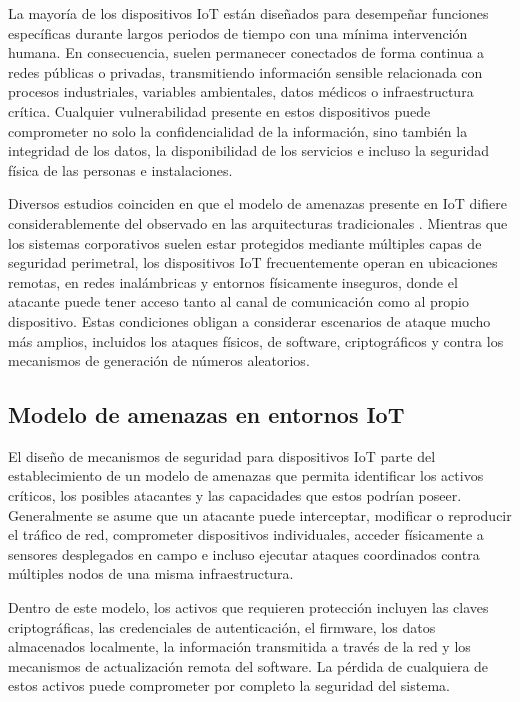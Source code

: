 La mayoría de los dispositivos IoT están diseñados para desempeñar funciones específicas durante largos periodos de tiempo con una mínima intervención humana. En consecuencia, suelen permanecer conectados de forma continua a redes públicas o privadas, transmitiendo información sensible relacionada con procesos industriales, variables ambientales, datos médicos o infraestructura crítica. Cualquier vulnerabilidad presente en estos dispositivos puede comprometer no solo la confidencialidad de la información, sino también la integridad de los datos, la disponibilidad de los servicios e incluso la seguridad física de las personas e instalaciones.

Diversos estudios coinciden en que el modelo de amenazas presente en IoT difiere considerablemente del observado en las arquitecturas tradicionales \cite{Seyhan2022ClassificationTaxonomy}. Mientras que los sistemas corporativos suelen estar protegidos mediante múltiples capas de seguridad perimetral, los dispositivos IoT frecuentemente operan en ubicaciones remotas, en redes inalámbricas y entornos físicamente inseguros, donde el atacante puede tener acceso tanto al canal de comunicación como al propio dispositivo. Estas condiciones obligan a considerar escenarios de ataque mucho más amplios, incluidos los ataques físicos, de software, criptográficos y contra los mecanismos de generación de números aleatorios.

\subsection{Modelo de amenazas en entornos IoT}

El diseño de mecanismos de seguridad para dispositivos IoT parte del establecimiento de un modelo de amenazas que permita identificar los activos críticos, los posibles atacantes y las capacidades que estos podrían poseer. Generalmente se asume que un atacante puede interceptar, modificar o reproducir el tráfico de red, comprometer dispositivos individuales, acceder físicamente a sensores desplegados en campo e incluso ejecutar ataques coordinados contra múltiples nodos de una misma infraestructura.

Dentro de este modelo, los activos que requieren protección incluyen las claves criptográficas, las credenciales de autenticación, el firmware, los datos almacenados localmente, la información transmitida a través de la red y los mecanismos de actualización remota del software. La pérdida de cualquiera de estos activos puede comprometer por completo la seguridad del sistema.

